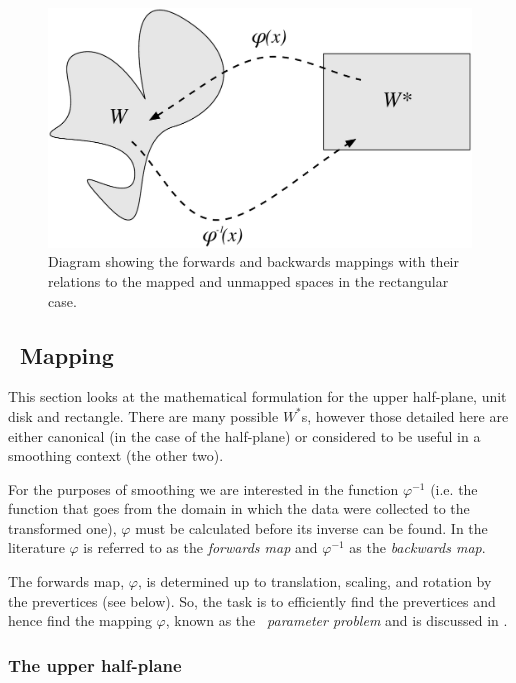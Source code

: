 \begin{figure} [t]
\centering
\includegraphics[scale=0.5]{sc/figs/mappingdia.pdf}
\caption{Diagram showing the forwards and backwards mappings with their relations to the mapped and unmapped spaces in the rectangular case.}
\label{mappingdia}
\end{figure}

\subsection{\sch\ Mapping}
\label{schparprob}
This section looks at the mathematical formulation for the upper half-plane, unit disk and rectangle. There are many possible $W^*$s, however those detailed here are either canonical (in the case of the half-plane) or considered to be useful in a smoothing context (the other two).

For the purposes of smoothing we are interested in the function $\varphi^{-1}$ (i.e. the function that goes from the domain in which the data were collected to the transformed one), $\varphi$ must be calculated before its inverse can be found. In the literature $\varphi$ is referred to as the \emph{forwards map} and $\varphi^{-1}$ as the \emph{backwards map}.

The forwards map, $\varphi$, is determined up to translation, scaling, and rotation by the prevertices (see below). So, the task is to efficiently find the prevertices and hence find the mapping $\varphi$, known as the \emph{\sch\ parameter problem} and is discussed in .

\subsubsection{The upper half-plane}
\label{sc-parprob}

